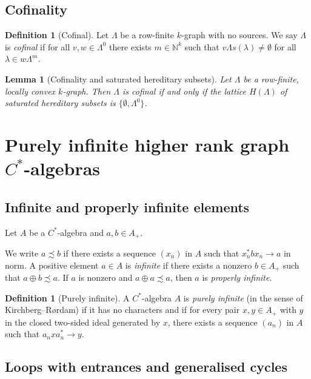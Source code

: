 \documentclass[12pt]{amsart}
\theoremstyle{plain}
\newtheorem{lemma}[theorem]{Lemma}
\theoremstyle{definition}
\newtheorem{definition}[theorem]{Definition}
\theoremstyle{remark}
\newcommand{\N}{\mathbb{N}}
\begin{document}
\subsection{Cofinality}

\begin{definition}[Cofinal]\label{def:cofinal}
Let $\Lambda$ be a row-finite $k$-graph with no sources. We say
$\Lambda$ is \emph{cofinal} if for all $v,w\in\Lambda^0$ there exists
$m\in\N^k$ such that $v\Lambda s(\lambda)\neq\emptyset$ for all
$\lambda\in w\Lambda^m$.
\end{definition}

\begin{lemma}[Cofinality and saturated hereditary subsets]\label{lem:cofinal}
Let $\Lambda$ be a row-finite, locally convex $k$-graph. Then $\Lambda$
is cofinal if and only if the lattice $H(\Lambda)$ of saturated hereditary
subsets is $\{ \emptyset,\Lambda^0\}$.
\end{lemma}

\section{Purely infinite higher rank graph $C^*$-algebras}\label{sec:pure-inf}

\subsection{Infinite and properly infinite elements}

Let $A$ be a $C^*$-algebra and $a,b\in A_+$.

We write $a\precsim b$ if there exists a sequence $(x_n)$ in $A$ such that
$x_n^* b x_n\to a$ in norm. A positive element $a\in A$ is \emph{infinite}
if there exists a nonzero $b\in A_+$ such that $a\oplus b\precsim a$.
If $a$ is nonzero and $a\oplus a\precsim a$, then $a$ is \emph{properly infinite}.

\begin{definition}[Purely infinite]\label{def:pure-inf}
A $C^*$-algebra $A$ is \emph{purely infinite} (in the sense of
Kirchberg--R\o rdam) if it has no characters and if for every pair
$x,y\in A_+$ with $y$ in the closed two-sided ideal generated by $x$,
there exists a sequence $(a_n)$ in $A$ such that $a_n x a_n^*\to y$.
\end{definition}

\subsection{Loops with entrances and generalised cycles}
\end{document}
